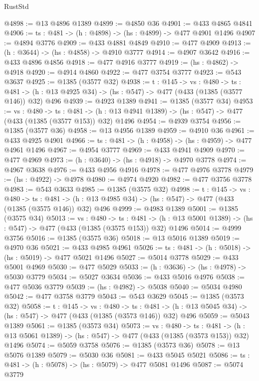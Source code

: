 \begin{lexlean}{RustStd}
\begin{coremodule}
@4898 := @13 @4896 @1389
@4899 := @4850 @36
@4901 := @433 @4865 @4841
@4906 := {ts : @481} -> (h : @4898) -> (hs : @4899) -> @477 @4901 @1496
@4907 := @4894 @3776
@4909 := @433 @4881 @4849
@4910 := @477 @4909
@4913 := (h : @3644) -> (hs : @4858) -> @4910 @3777
@4914 := @4907 @3642
@4916 := @433 @4896 @4856
@4918 := @477 @4916 @3777
@4919 := (hs : @4862) -> @4918
@4920 := @4914 @4860
@4922 := @477 @3754 @3777
@4923 := @543 @3637
@4925 := @1385 (@3577 @32)
@4938 := {t : @145} ->
  {vs : @480} ->
  {ts : @481} -> (h : @13 @4925 @34) -> (hs : @547) -> @477 (@433 (@1385 (@3577 @146)) @32) @496
@4939 := @4923 @1389
@4941 := @1385 (@3577 @34)
@4953 := {vs : @480} ->
  {ts : @481} -> (h : @13 @4941 @1389) -> (hs : @547) -> @477 (@433 (@1385 (@3577 @153)) @32) @1496
@4954 := @4939 @3754
@4956 := @1385 (@3577 @36)
@4958 := @13 @4956 @1389
@4959 := @4910 @36
@4961 := @433 @4925 @4901
@4966 := {ts : @481} -> (h : @4958) -> (hs : @4959) -> @477 @4961 @1496
@4967 := @4954 @3777
@4969 := @433 @4941 @4909
@4970 := @477 @4969
@4973 := (h : @3640) -> (hs : @4918) -> @4970 @3778
@4974 := @4967 @3638
@4976 := @433 @4956 @4916
@4978 := @477 @4976 @3778
@4979 := (hs : @4922) -> @4978
@4980 := @4974 @4920
@4982 := @477 @3756 @3778
@4983 := @543 @3633
@4985 := @1385 (@3575 @32)
@4998 := {t : @145} ->
  {vs : @480} ->
  {ts : @481} -> (h : @13 @4985 @34) -> (hs : @547) -> @477 (@433 (@1385 (@3575 @146)) @32) @496
@4999 := @4983 @1389
@5001 := @1385 (@3575 @34)
@5013 := {vs : @480} ->
  {ts : @481} -> (h : @13 @5001 @1389) -> (hs : @547) -> @477 (@433 (@1385 (@3575 @153)) @32) @1496
@5014 := @4999 @3756
@5016 := @1385 (@3575 @36)
@5018 := @13 @5016 @1389
@5019 := @4970 @36
@5021 := @433 @4985 @4961
@5026 := {ts : @481} -> (h : @5018) -> (hs : @5019) -> @477 @5021 @1496
@5027 := @5014 @3778
@5029 := @433 @5001 @4969
@5030 := @477 @5029
@5033 := (h : @3636) -> (hs : @4978) -> @5030 @3779
@5034 := @5027 @3634
@5036 := @433 @5016 @4976
@5038 := @477 @5036 @3779
@5039 := (hs : @4982) -> @5038
@5040 := @5034 @4980
@5042 := @477 @3758 @3779
@5043 := @543 @3629
@5045 := @1385 (@3573 @32)
@5058 := {t : @145} ->
  {vs : @480} ->
  {ts : @481} -> (h : @13 @5045 @34) -> (hs : @547) -> @477 (@433 (@1385 (@3573 @146)) @32) @496
@5059 := @5043 @1389
@5061 := @1385 (@3573 @34)
@5073 := {vs : @480} ->
  {ts : @481} -> (h : @13 @5061 @1389) -> (hs : @547) -> @477 (@433 (@1385 (@3573 @153)) @32) @1496
@5074 := @5059 @3758
@5076 := @1385 (@3573 @36)
@5078 := @13 @5076 @1389
@5079 := @5030 @36
@5081 := @433 @5045 @5021
@5086 := {ts : @481} -> (h : @5078) -> (hs : @5079) -> @477 @5081 @1496
@5087 := @5074 @3779

\end{coremodule}
\end{lexlean}
